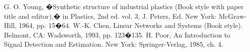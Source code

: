 \documentclass[letterpaper, 10 pt, conference]{ieeeconf}  %
\begin{document}




\begin{thebibliography}{99}

 G. O. Young, �Synthetic structure of industrial plastics (Book style with paper title and editor),� 	in Plastics, 2nd ed. vol. 3, J. Peters, Ed.  New York: McGraw-Hill, 1964, pp. 15�64.
 W.-K. Chen, Linear Networks and Systems (Book style).	Belmont, CA: Wadsworth, 1993, pp. 123�135.
 H. Poor, An Introduction to Signal Detection and Estimation.   New York: Springer-Verlag, 1985, ch. 4.


\end{thebibliography}
\end{document}
